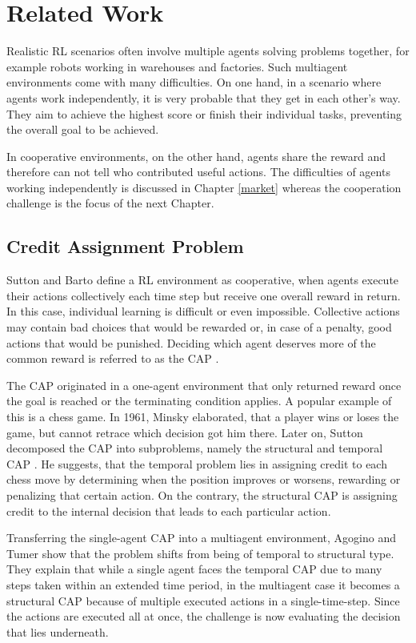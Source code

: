 \chapter{Related Work}\label{sec:RelatedWork}
Realistic RL scenarios often involve multiple agents solving problems together, for example robots working in warehouses and factories. Such multiagent environments come with many difficulties. On one hand, in a scenario where agents work independently, it is very probable that they get in each other's way. They aim to achieve the highest score or finish their individual tasks, preventing the overall goal to be achieved.

In cooperative environments, on the other hand, agents share the reward and therefore can not tell who contributed useful actions. The difficulties of agents working independently is discussed in Chapter \ref{market} whereas the cooperation challenge is the focus of the next Chapter.

\section{Credit Assignment Problem}\label{CAP}
Sutton and Barto \cite{suba18} define a RL environment as cooperative, when agents execute their actions collectively each time step but receive one overall reward in return. In this case, individual learning is difficult or even impossible. Collective actions may contain bad choices that would be rewarded or, in case of a penalty, good actions that would be punished. Deciding which agent deserves more of the common reward is referred to as the CAP \cite{mi61}.

The CAP originated in a one-agent environment that only returned reward once the goal is reached or the terminating condition applies. A popular example of this is a chess game. In 1961, Minsky \cite{mi61} elaborated, that a player wins or loses the game, but cannot retrace which decision got him there. Later on, Sutton decomposed the CAP into subproblems, namely the structural and temporal CAP \cite{su84}. He suggests, that the temporal problem lies in assigning credit to each chess move by determining when the position improves or worsens, rewarding or penalizing that certain action. On the contrary, the structural CAP is assigning credit to the internal decision that leads to each particular action.

Transferring the single-agent CAP into a multiagent environment, Agogino and Tumer \cite{agtu04} show that the problem shifts from being of temporal to structural type. They explain that while a single agent faces the temporal CAP due to many steps taken within an extended time period, in the multiagent case it becomes a structural CAP because of multiple executed actions in a single-time-step. Since the actions are executed all at once, the challenge is now evaluating the decision that lies underneath.

